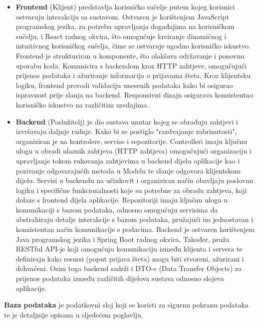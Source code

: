 \begin{itemize}
	\item \textbf{Frontend} (Klijent) predstavlja korisničko sučelje putem kojeg korisnici ostvaruju interakciju sa sustavom. Ostvaren je korištenjem JavaScript programskog jezika, za potrebu upravljanja događajima na korisničkom sučelju, i React radnog okvira, što omogućuje kreiranje dinamičnog i intuitivnog korisničkog sučelja, čime se ostvaruje ugodno korisničko iskustvo. Frontend je strukturiran u komponente, što olakšava održavanje i ponovnu uporabu koda. Komunicira s backendom kroz HTTP zahtjeve, omogučujući prijenos podataka i ažuriranje informacija o prijavama šteta. Kroz klijentsku logiku, frontend provodi validaciju unesenih podataka kako bi osigurao ispravnost prije slanja na backend. Responsivni dizajn osigurava konzistentno korisničko iskustvo na različitim uređajima.	
	\item \textbf{Backend} (Poslužitelj) je dio sustava unutar kojeg se obrađuju zahtjevi i izvršavaju daljnje radnje. Kako bi se postiglo "razdvajanje zabrinutosti", organiziran je na kontrolere, servise i repozitorije. Controlleri imaju ključnu ulogu u obradi ulaznih zahtjeva (HTTP zahtjeva) omogučujući organizaciju i upravljanje tokom rukovanja zahtjevima u backend dijelu aplikacije kao i pozivanje odgovarajućih metoda u Modelu te slanje odgovora klijentskom dijelu. Servisi u backendu na učinkovit i organiziran način obavljaju poslovnu logiku i specifične funkcionalnosti koje su potrebne za obradu zahtjeva, koji dolaze s frontend dijela aplikacije. Repozitoriji imaju ključnu ulogu u komunikaciji s bazom podataka, odnosno omogućuju servisima da abstrahiraju detalje interakcije s bazom podataka, pružajući im jednostavan i konzistentan način komunikacije s podacima. Backend je ostvaren korištenjem Java programskog jezika i Spring Boot radnog okvira. Također, pruža RESTful API-je koji omogućuju komunikaciju između klijenta i servera te definiraju kako resursi (poput prijava šteta) mogu biti stvoreni, ažurirani i dohvaćeni. Osim toga backend sadrži i DTO-e (Data Transfer Objects) za prijenos podataka između različitih dijelova sustava odnosno slojeva aplikacije. 
\end{itemize}

\noindent \textbf{Baza podataka} je podatkovni sloj koji se koristi za sigurnu pohranu podataka te je detaljnije opisana u sljedećem poglavlju.

